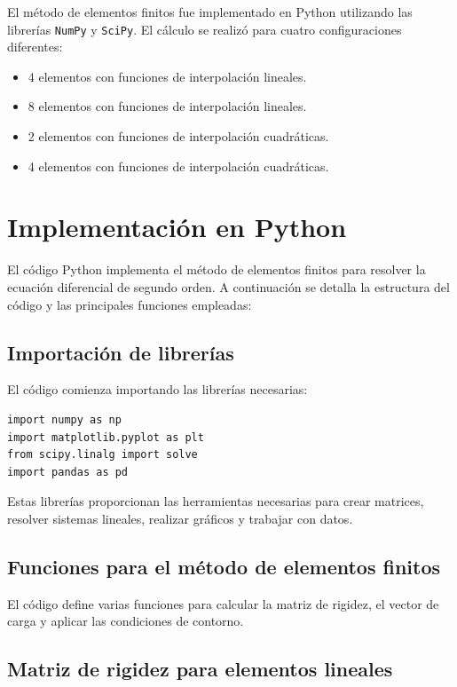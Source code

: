 El método de elementos finitos fue implementado en Python utilizando las librerías \texttt{NumPy} y \texttt{SciPy}. El cálculo se realizó para cuatro configuraciones diferentes:

\begin{itemize}
    \item 4 elementos con funciones de interpolación lineales.
    \item 8 elementos con funciones de interpolación lineales.
    \item 2 elementos con funciones de interpolación cuadráticas.
    \item 4 elementos con funciones de interpolación cuadráticas.
\end{itemize}

\section{Implementación en Python}

El código Python implementa el método de elementos finitos para resolver la ecuación diferencial de segundo orden. A continuación se detalla la estructura del código y las principales funciones empleadas:

\subsection{Importación de librerías}

El código comienza importando las librerías necesarias:

\begin{verbatim}
import numpy as np
import matplotlib.pyplot as plt
from scipy.linalg import solve
import pandas as pd
\end{verbatim}

Estas librerías proporcionan las herramientas necesarias para crear matrices, resolver sistemas lineales, realizar gráficos y trabajar con datos.

\subsection{Funciones para el método de elementos finitos}

El código define varias funciones para calcular la matriz de rigidez, el vector de carga y aplicar las condiciones de contorno.

\subsection{Matriz de rigidez para elementos lineales}

